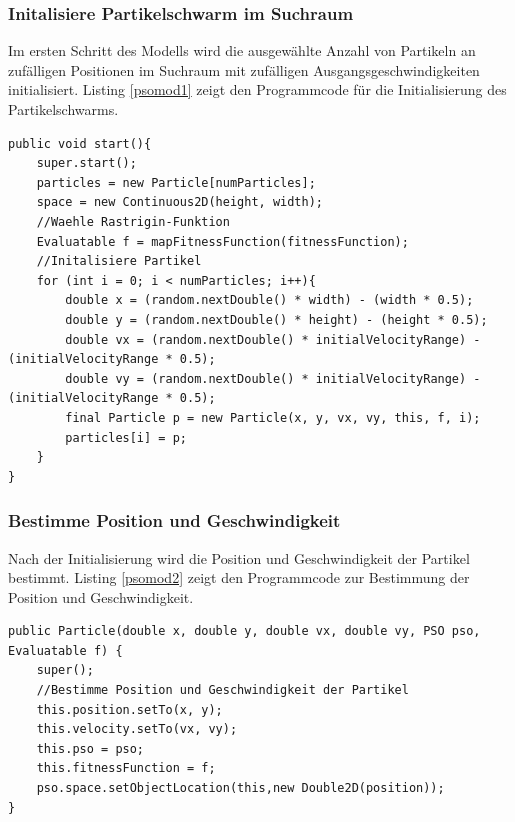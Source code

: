 \documentclass[a4paper, 11pt]{article}
\newcounter{pos}
\begin{document}
\subsubsection{Initalisiere Partikelschwarm im Suchraum}
Im ersten Schritt des Modells wird die ausgewählte Anzahl von Partikeln an zufälligen Positionen im Suchraum mit zufälligen Ausgangsgeschwindigkeiten initialisiert. Listing \ref{psomod1} zeigt den Programmcode für die Initialisierung des Partikelschwarms.\newline 
\begin{lstlisting}[caption= PSO: Initalisierte Partikelschwarm im Suchraum,label = psomod1]
public void start(){
	super.start();	
	particles = new Particle[numParticles];
	space = new Continuous2D(height, width);
	//Waehle Rastrigin-Funktion
	Evaluatable f = mapFitnessFunction(fitnessFunction);            
	//Initalisiere Partikel
	for (int i = 0; i < numParticles; i++){
		double x = (random.nextDouble() * width) - (width * 0.5);
		double y = (random.nextDouble() * height) - (height * 0.5);
		double vx = (random.nextDouble() * initialVelocityRange) - (initialVelocityRange * 0.5);
		double vy = (random.nextDouble() * initialVelocityRange) - (initialVelocityRange * 0.5);
		final Particle p = new Particle(x, y, vx, vy, this, f, i);
		particles[i] = p;
	}
}
\end{lstlisting}
\subsubsection{Bestimme Position und Geschwindigkeit}
Nach der Initialisierung wird die Position und Geschwindigkeit der Partikel bestimmt. Listing \ref{psomod2} zeigt den Programmcode zur Bestimmung der Position und Geschwindigkeit.\newline
\begin{lstlisting}[caption= PSO: Bestimme Position und Geschwindigkeit,label = psomod2]
public Particle(double x, double y, double vx, double vy, PSO pso, Evaluatable f) {
	super();
	//Bestimme Position und Geschwindigkeit der Partikel
	this.position.setTo(x, y);
	this.velocity.setTo(vx, vy);
	this.pso = pso;
	this.fitnessFunction = f;
	pso.space.setObjectLocation(this,new Double2D(position));
}
\end{lstlisting}
\end{document}
